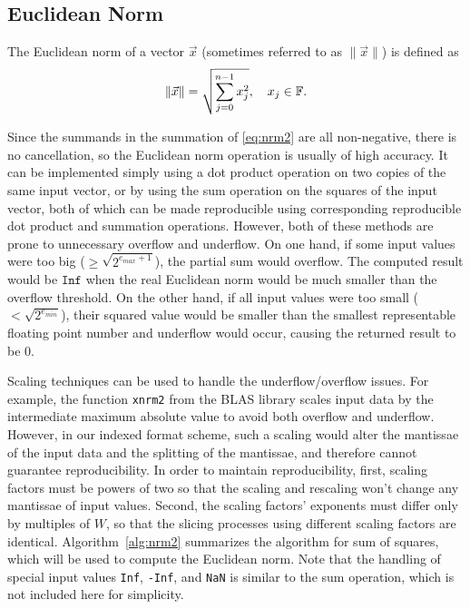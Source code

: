 \subsection{Euclidean Norm}
  \label{sec:compositeops_nrm}
    The Euclidean norm of a vector $\vec{x}$ (sometimes referred to as $\|\vec{x}\|$) is defined as
    \begin{equation}
        \|\vec{x}\| = \sqrt{\sum_{j=0}^{n-1} x_j^2}, \quad x_j \in \mathbb{F}.
        \label{eq:nrm2}
    \end{equation}

    Since the summands in the summation of \eqref{eq:nrm2} are all non-negative,
    there is no cancellation, so the Euclidean norm operation
    is usually of high accuracy.
    It can be implemented simply using a dot product operation on two copies of the same input vector,
    or by using the sum operation on the squares of the input vector,
    both of which can be made reproducible using corresponding reproducible
    dot product and summation operations. However, both of these methods are prone to unnecessary overflow and underflow.
    On one hand, if some input values were too big ($\geq \sqrt{2^{e_{max}+1}}$),
    the partial sum would overflow. The computed result would
    be $\texttt{Inf}$ when the real Euclidean norm would be much smaller than the
    overflow threshold.
    On the other hand, if all input values were too small ($ < \sqrt{2^{e_{min}}}$),
    their squared value would be smaller than the smallest representable floating point number and 
    underflow would occur, causing the returned result to be 0.

    Scaling techniques can be used to handle the underflow/overflow issues.
    For example, the function \texttt{xnrm2} from the BLAS library \cite{BLAS}
    scales input data by the intermediate maximum absolute value
    to avoid both overflow and underflow.
    However, in our indexed format scheme, such a scaling would alter
    the mantissae of the input data and the splitting of the mantissae, and therefore
    cannot guarantee reproducibility.
    In order to maintain reproducibility, 
    first, scaling factors must be powers of two so that the scaling and rescaling
    won't change any mantissae of input values.
    Second, the scaling factors' exponents must differ only by multiples of $W$,
    so that the slicing processes using different scaling factors are identical.
    Algorithm~\ref{alg:nrm2} summarizes the algorithm for sum of squares,
    which will be used to compute the Euclidean norm.
    Note that the handling of special input values \texttt{Inf}, \texttt{-Inf}, and \texttt{NaN}
    is similar to the sum operation, which is not included here for simplicity.


